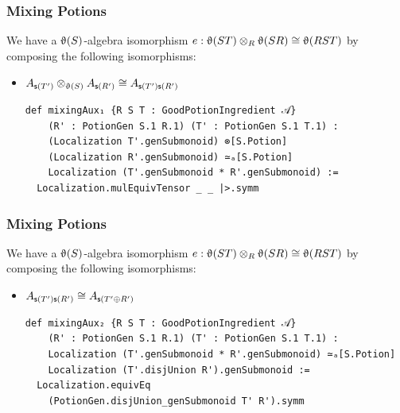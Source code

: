 \documentclass[9pt]{beamer}
\begin{document}
\begin{frame}[fragile]
\frametitle{Mixing Potions}
  We have a $\operatorname{\upvartheta}(S)$-algebra isomorphism $e: \operatorname{\upvartheta}(ST) \otimes_R \operatorname{\upvartheta}(SR) \cong \operatorname{\upvartheta}(RST)$ by 
  composing the following isomorphisms:
\begin{itemize}
  \item $A_{\mathsf{s}(T')} \otimes_{\operatorname{\upvartheta}(S)} A_{\mathsf{s}(R')} \cong A_{\mathsf{s}(T')\mathsf{s}(R')}$
  \begin{lstlisting}
def mixingAux₁ {R S T : GoodPotionIngredient 𝒜}
    (R' : PotionGen S.1 R.1) (T' : PotionGen S.1 T.1) :
    (Localization T'.genSubmonoid) ⊗[S.Potion] 
    (Localization R'.genSubmonoid) ≃ₐ[S.Potion]
    Localization (T'.genSubmonoid * R'.genSubmonoid) :=
  Localization.mulEquivTensor _ _ |>.symm
  \end{lstlisting}
\end{itemize}
\end{frame}


\begin{frame}[fragile]
\frametitle{Mixing Potions}
  We have a $\operatorname{\upvartheta}(S)$-algebra isomorphism $e: \operatorname{\upvartheta}(ST) \otimes_R \operatorname{\upvartheta}(SR) \cong \operatorname{\upvartheta}(RST)$ by 
  composing the following isomorphisms:
\begin{itemize}
  \item $A_{\mathsf{s}(T')\mathsf{s}(R')} \cong A_{\mathsf{s}(T'\oplus R')}$
  \begin{lstlisting}
def mixingAux₂ {R S T : GoodPotionIngredient 𝒜}
    (R' : PotionGen S.1 R.1) (T' : PotionGen S.1 T.1) :
    Localization (T'.genSubmonoid * R'.genSubmonoid) ≃ₐ[S.Potion]
    Localization (T'.disjUnion R').genSubmonoid :=
  Localization.equivEq 
    (PotionGen.disjUnion_genSubmonoid T' R').symm
  \end{lstlisting}
\end{itemize}
\end{frame}
\end{document}
